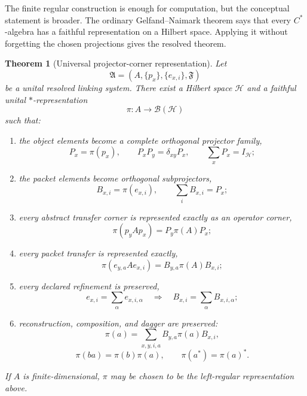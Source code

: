 \documentclass[11pt]{article}
\newtheorem{theorem}{Theorem}[section]
\theoremstyle{definition}
\theoremstyle{remark}
\begin{document}
The finite regular construction is enough for computation, but the conceptual statement is broader.  The ordinary Gelfand--Naimark theorem says that every $C^*$-algebra has a faithful representation on a Hilbert space.  Applying it without forgetting the chosen projections gives the resolved theorem.

\begin{theorem}[Universal projector-corner representation]
\label{thm:universal-projector-corner}
Let
\[
\mathfrak A=
\left(A,\{p_x\},\{e_{x,i}\},\mathfrak F\right)
\]
be a unital resolved linking system.  There exist a Hilbert space $\mathcal H$ and a faithful unital $*$-representation
\[
\pi:A\longrightarrow\mathcal B(\mathcal H)
\]
such that:
\begin{enumerate}[label=\textup{(\roman*)}]
\item the object elements become a complete orthogonal projector family,
\[
P_x=\pi(p_x),
\qquad
P_xP_y=\delta_{xy}P_x,
\qquad
\sum_xP_x=I_\mathcal H;
\]
\item the packet elements become orthogonal subprojectors,
\[
B_{x,i}=\pi(e_{x,i}),
\qquad
\sum_iB_{x,i}=P_x;
\]
\item every abstract transfer corner is represented exactly as an operator corner,
\[
\boxed{
\pi(p_yAp_x)
=
P_y\pi(A)P_x;
}
\]
\item every packet transfer is represented exactly,
\[
\boxed{
\pi(e_{y,a}Ae_{x,i})
=
B_{y,a}\pi(A)B_{x,i};
}
\]
\item every declared refinement is preserved,
\[
e_{x,i}=\sum_\alpha e_{x,i,\alpha}
\quad\Longrightarrow\quad
B_{x,i}=\sum_\alpha B_{x,i,\alpha};
\]
\item reconstruction, composition, and dagger are preserved:
\[
\pi(a)
=
\sum_{x,y,i,a}
B_{y,a}\pi(a)B_{x,i},
\]
\[
\pi(ba)=\pi(b)\pi(a),
\qquad
\pi(a^*)=\pi(a)^*.
\]
\end{enumerate}
If $A$ is finite-dimensional, $\pi$ may be chosen to be the left-regular representation above.
\end{theorem}
\end{document}
